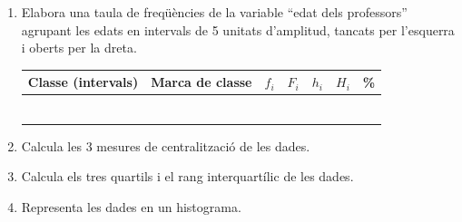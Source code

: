 \documentclass[12pt,a4paper]{article}
\begin{document}
\begin{enumerate}[label=\alph*)]
    \item Elabora una taula de freqüències de la variable “edat dels professors” agrupant les edats en intervals de 5 unitats d’amplitud, tancats per l’esquerra i oberts per la dreta. \vspace{0.3cm}

    \begin{center}
    \renewcommand{\arraystretch}{1.4}
    \begin{tabular}{|c|c|c|c|c|c|c|}
    \hline
    \textbf{Classe (intervals)} & \textbf{Marca de classe} & \textbf{$f_i$} & \textbf{$F_i$} & \textbf{$h_i$} & \textbf{$H_i$} & \textbf{\%} \\ \hline
     &  &  &  &  &  &  \\ \hline
     &  &  &  &  &  &  \\ \hline
     &  &  &  &  &  &  \\ \hline
     &  &  &  &  &  &  \\ \hline
     &  &  &  &  &  &  \\ \hline
     &  &  &  &  &  &  \\ \hline
    \end{tabular}
    \end{center}

    \item Calcula les 3 mesures de centralització de les dades. \vspace{0.8cm}
    \item Calcula els tres quartils i el rang interquartílic de les dades. \vspace{0.8cm}
    \item Representa les dades en un histograma. \vspace{0.3cm}
\end{enumerate}

\begin{center}
\end{center}
\end{document}
